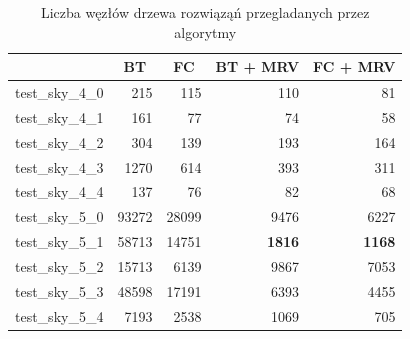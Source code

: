 \documentclass{article}
\begin{document}
	\begin{table}[H]
		\caption{Liczba węzłów drzewa rozwiąząń przegladanych przez algorytmy}
		\label{tab:skyscrapper_solutions}
		\begin{center}
			\begin{tabular}{|l|r|r|r|r|}
				\hline
				& \multicolumn{1}{c|}{\textbf{BT}} & \multicolumn{1}{c|}{\textbf{FC}} & \multicolumn{1}{c|}{\textbf{BT + MRV}} & \multicolumn{1}{c|}{\textbf{FC + MRV}} \\ \hline
				test\_sky\_4\_0 & 215                              & 115                              & 110                                    & 81                                     \\ \hline
				test\_sky\_4\_1 & 161                              & 77                               & 74                                     & 58                                     \\ \hline
				test\_sky\_4\_2 & 304                              & 139                              & 193                                    & 164                                    \\ \hline
				test\_sky\_4\_3 & 1270                             & 614                              & 393                                    & 311                                    \\ \hline
				test\_sky\_4\_4 & 137                              & 76                               & 82                                     & 68                                     \\ \hline
				test\_sky\_5\_0 & 93272                            & 28099                            & 9476                                   & 6227                                   \\ \hline
				test\_sky\_5\_1 & 58713                            & 14751                            & \textbf{1816}                          & \textbf{1168}                          \\ \hline
				test\_sky\_5\_2 & 15713                            & 6139                             & 9867                                   & 7053                                   \\ \hline
				test\_sky\_5\_3 & 48598                            & 17191                            & 6393                                   & 4455                                   \\ \hline
				test\_sky\_5\_4 & 7193                             & 2538                             & 1069                                   & 705                                    \\ \hline

\end{tabular}
\end{center}
\end{table}
\end{document}
